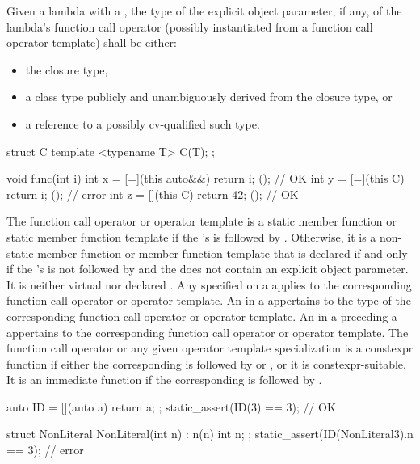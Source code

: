 \pnum
Given a lambda with a ,
the type of the explicit object parameter, if any,
of the lambda's function call operator
(possibly instantiated from a function call operator template)
shall be either:
\begin{itemize}
\item
the closure type,
\item
a class type publicly and unambiguously derived from the closure type, or
\item
a reference to a possibly cv-qualified such type.
\end{itemize}
\begin{example}
\begin{codeblock}
struct C {
  template <typename T>
  C(T);
};

void func(int i) {
  int x = [=](this auto&&) { return i; }();     // OK
  int y = [=](this C) { return i; }();          // error
  int z = [](this C) { return 42; }();          // OK
}
\end{codeblock}
\end{example}

\pnum
The function call operator or operator template is
a static member function or static member function template
if the 's
 is followed by .
Otherwise, it is
a non-static member function or member function template
that is declared
 if and only if the
's  is not
followed by  and
the  does not contain
an explicit object parameter.
It is neither virtual nor declared . Any
 specified on a 
applies to the corresponding function call operator or operator template.
An  in a  appertains
to the type of the corresponding function call operator or operator template.
An  in a 
preceding a 
appertains to the corresponding function call operator or operator template.
The function call operator or any given operator template specialization
is a constexpr function if either
the corresponding 
is followed by  or , or
it is constexpr-suitable.
It is an immediate function
if the corresponding 
 is followed by .
\begin{example}
\begin{codeblock}
auto ID = [](auto a) { return a; };
static_assert(ID(3) == 3);                      // OK

struct NonLiteral {
  NonLiteral(int n) : n(n) { }
  int n;
};
static_assert(ID(NonLiteral{3}).n == 3);        // error
\end{codeblock}
\end{example}


